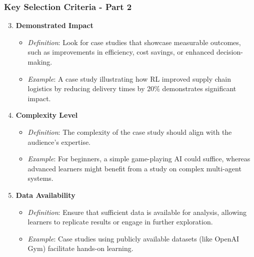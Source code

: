\documentclass[aspectratio=169]{beamer}
\begin{document}
\begin{frame}[fragile]
    \frametitle{Key Selection Criteria - Part 2}
    \begin{enumerate}
        \setcounter{enumi}{2} %
        \item \textbf{Demonstrated Impact}
            \begin{itemize}
                \item \textit{Definition}: Look for case studies that showcase measurable outcomes, such as improvements in efficiency, cost savings, or enhanced decision-making.
                \item \textit{Example}: A case study illustrating how RL improved supply chain logistics by reducing delivery times by 20\% demonstrates significant impact.
            \end{itemize}

        \item \textbf{Complexity Level}
            \begin{itemize}
                \item \textit{Definition}: The complexity of the case study should align with the audience's expertise.
                \item \textit{Example}: For beginners, a simple game-playing AI could suffice, whereas advanced learners might benefit from a study on complex multi-agent systems.
            \end{itemize}

        \item \textbf{Data Availability}
            \begin{itemize}
                \item \textit{Definition}: Ensure that sufficient data is available for analysis, allowing learners to replicate results or engage in further exploration.
                \item \textit{Example}: Case studies using publicly available datasets (like OpenAI Gym) facilitate hands-on learning.
            \end{itemize}
    \end{enumerate}
\end{frame}
\end{document}
